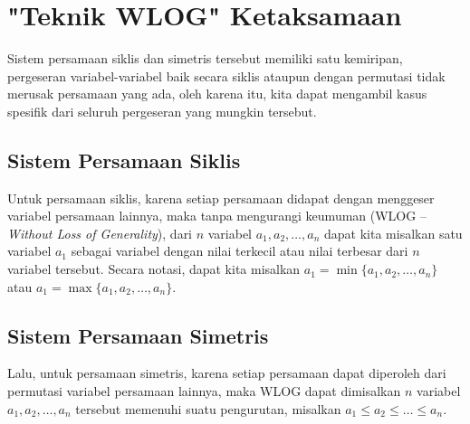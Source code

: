 \documentclass[12pt]{scrartcl}
\begin{document}
\section{"Teknik WLOG" Ketaksamaan}
Sistem persamaan siklis dan simetris tersebut memiliki satu kemiripan, pergeseran variabel-variabel baik secara siklis ataupun dengan permutasi tidak merusak persamaan yang ada, oleh karena itu, kita dapat mengambil kasus spesifik dari seluruh pergeseran yang mungkin tersebut.

\subsection{Sistem Persamaan Siklis}
Untuk persamaan siklis, karena setiap persamaan didapat dengan menggeser variabel persamaan lainnya, maka tanpa mengurangi keumuman (WLOG --\textit{ Without Loss of Generality}), dari $n$ variabel $a_1,a_2,\dots,a_n$ dapat kita misalkan satu variabel $a_1$ sebagai variabel dengan nilai terkecil atau nilai terbesar dari $n$ variabel tersebut. Secara notasi, dapat kita misalkan $a_1 = \min\{a_1,a_2,\dots,a_n\}$ atau $a_1 = \max\{a_1,a_2,\dots,a_n\}$. 

\subsection{Sistem Persamaan Simetris}
Lalu, untuk persamaan simetris, karena setiap persamaan dapat diperoleh dari permutasi variabel persamaan lainnya, maka WLOG dapat dimisalkan $n$ variabel $a_1,a_2,\dots,a_n$ tersebut memenuhi suatu pengurutan, misalkan $a_1 \le a_2 \le \dots \le a_n$.
\end{document}
